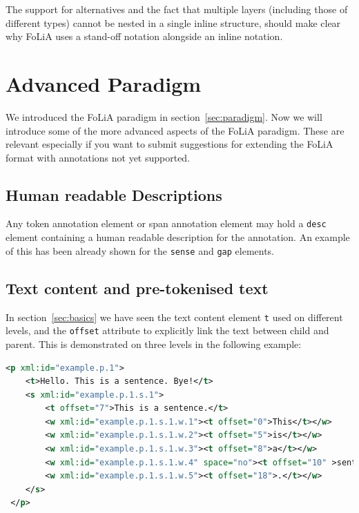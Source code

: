 \documentclass[a4paper,12pt]{report}
\begin{document}
The support for alternatives and the fact that multiple layers (including those of different types) cannot be nested in a single inline structure, should make clear why FoLiA uses a stand-off notation alongside an inline notation. 



\section{Advanced Paradigm}
\label{sec:advparadigm}

We introduced the FoLiA paradigm in section~\ref{sec:paradigm}. Now we will introduce some of the more advanced aspects of the FoLiA paradigm. These are relevant especially if you want to submit suggestions for extending the FoLiA format with annotations not yet supported.

\subsection{Human readable Descriptions}

Any token annotation element or span annotation element may hold a \texttt{desc} element containing a human readable description for the annotation. An example of this has been already shown for the \texttt{sense} and \texttt{gap} elements.

\subsection{Text content and pre-tokenised text}
\label{sec:textcontent}

In section~\ref{sec:basics} we have seen the text content element \texttt{t} used on different levels, and the \texttt{offset} attribute to explicitly link the text between child and parent. This is demonstrated on three levels in the following example:

\begin{lstlisting}[language=xml]
 <p xml:id="example.p.1">
    <t>Hello. This is a sentence. Bye!</t>
    <s xml:id="example.p.1.s.1">        
        <t offset="7">This is a sentence.</t>    
        <w xml:id="example.p.1.s.1.w.1"><t offset="0">This</t></w>
        <w xml:id="example.p.1.s.1.w.2"><t offset="5">is</t></w>
        <w xml:id="example.p.1.s.1.w.3"><t offset="8">a</t></w>
        <w xml:id="example.p.1.s.1.w.4" space="no"><t offset="10" >sentence</t></w>
        <w xml:id="example.p.1.s.1.w.5"><t offset="18">.</t></w>
    </s>
 </p>
\end{lstlisting}
\end{document}
